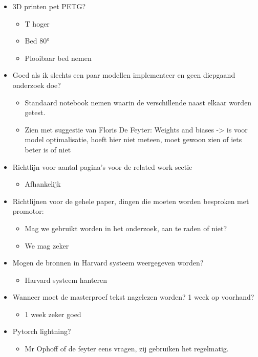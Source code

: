 \documentclass{article}
\begin{document}
	\begin{itemize}
	\item 3D printen pet PETG? 
		\begin{itemize}
		\item T hoger
		\item Bed 80°
		\item Plooibaar bed nemen
		\end{itemize}
	\item Goed als ik slechts een paar modellen implementeer en geen diepgaand onderzoek doe?
		\begin{itemize}
		\item Standaard notebook nemen waarin de verschillende naast elkaar worden getest. 
		\item Zien met suggestie van Floris De Feyter: Weights and biases -\textgreater{} is voor model optimalisatie, hoeft hier niet meteen, moet gewoon zien of iets beter is of niet
		\end{itemize}
	\item Richtlijn voor aantal pagina’s voor de related work sectie
		\begin{itemize}
		\item Afhankelijk
		\end{itemize}
	\end{itemize}


	\begin{itemize}
	\item Richtlijnen voor de gehele paper, dingen die moeten worden besproken met promotor:
		\begin{itemize}
		\item Mag we gebruikt worden in het onderzoek, aan te raden of niet?
		\item We mag zeker
		\end{itemize}
	\item Mogen de bronnen in Harvard systeem weergegeven worden?
		\begin{itemize}
		\item Harvard systeem hanteren
		\end{itemize}
	\item Wanneer moet de masterproef tekst nagelezen worden? 1 week op voorhand?
		\begin{itemize}
		\item 1 week zeker goed
		\end{itemize}
	\item Pytorch lightning?
		\begin{itemize}
		\item Mr Ophoff of de feyter eens vragen, zij gebruiken het regelmatig.
		\end{itemize}
	\end{itemize}
\end{document}
